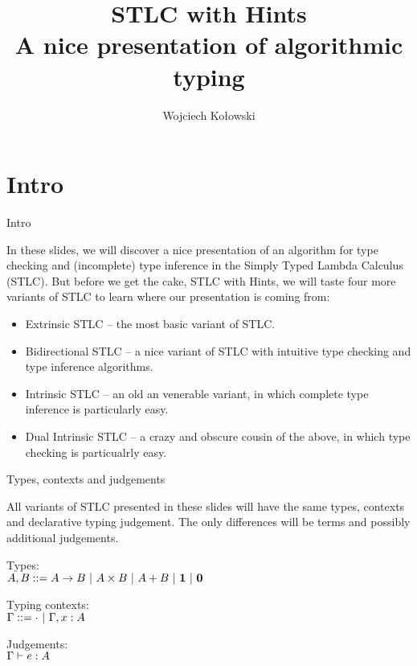 \documentclass{beamer}
\title{STLC with Hints\\A nice presentation of algorithmic typing}
\author{Wojciech Kołowski}
\begin{document}
\frame{\titlepage}

\section{Intro}

\begin{frame}{Intro}

In these slides, we will discover a nice presentation of an algorithm for type checking and (incomplete) type inference in the Simply Typed Lambda Calculus (STLC). But before we get the cake, STLC with Hints, we will taste four more variants of STLC to learn where our presentation is coming from:

\begin{itemize}
  \item Extrinsic STLC -- the most basic variant of STLC.
  \item Bidirectional STLC -- a nice variant of STLC with intuitive type checking and type inference algorithms.
  \item Intrinsic STLC -- an old an venerable variant, in which complete type inference is particularly easy.
  \item Dual Intrinsic STLC -- a crazy and obscure cousin of the above, in which type checking is particualrly easy.
\end{itemize}

\end{frame}

\begin{frame}{Types, contexts and judgements}

All variants of STLC presented in these slides will have the same types, contexts and declarative typing judgement. The only differences will be terms and possibly additional judgements.

\vspace{2em}

Types: \\
$A, B ::= A \to B \ |\  A \times B \ |\  A + B \ |\  \textbf{1} \ |\  \textbf{0}$

\vspace{2em}

Typing contexts: \\
$\Gamma ::= \cdot \ |\  \Gamma, x : A$

\vspace{2em}

Judgements: \\
$\Gamma \vdash e : A$

\end{frame}
\end{document}
